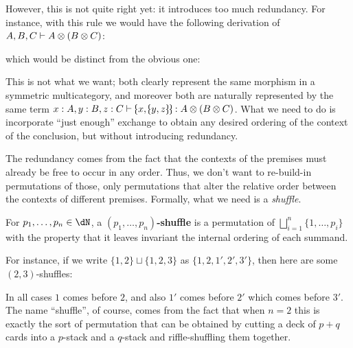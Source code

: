 However, this is not quite right yet: it introduces too much redundancy.
For instance, with this rule we would have the following derivation of $A,B,C\types A\tensor (B\tensor C)$:
\begin{mathpar}
\end{mathpar}
which would be distinct from the obvious one:
\begin{mathpar}
\end{mathpar}
This is not what we want; both clearly represent the same morphism in a symmetric multicategory, and moreover both are naturally represented by the same term $x:A,y:B,z:C \types \tpair{x}{\tpair{y}{z}}:A\tensor (B\tensor C)$.
What we need to do is incorporate ``just enough'' exchange to obtain any desired ordering of the context of the conclusion, but without introducing redundancy.

The redundancy comes from the fact that the contexts of the premises must already be free to occur in any order.
Thus, we don't want to re-build-in permutations of those, only permutations that alter the relative order between the contexts of different premises.
Formally, what we need is a \emph{shuffle}.

\begin{defn}
  For $p_1,\dots,p_n \in \dN$, a \textbf{$(p_1,\dots,p_n)$-shuffle} is a permutation of $\bigsqcup_{i=1}^n\{1,\dots,p_i\}$ with the property that it leaves invariant the internal ordering of each summand.
\end{defn}

For instance, if we write $\{1,2\}\sqcup \{1,2,3\}$ as $\{1,2,1',2',3'\}$, then here are some $(2,3)$-shuffles:
In all cases $1$ comes before $2$, and also $1'$ comes before $2'$ which comes before $3'$.
The name ``shuffle'', of course, comes from the fact that when $n=2$ this is exactly the sort of permutation that can be obtained by cutting a deck of $p+q$ cards into a $p$-stack and a $q$-stack and riffle-shuffling them together.

